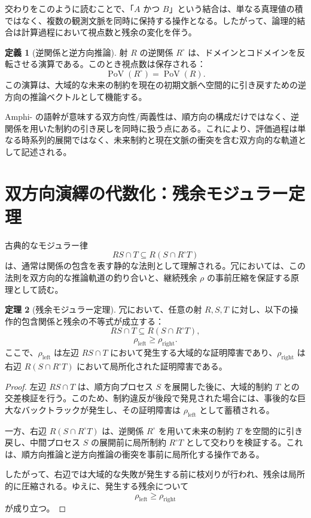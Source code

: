 \documentclass[a4paper,11pt]{article}
\newcommand{\PoV}{\operatorname{PoV}}
\theoremstyle{definition}
\newtheorem{definition}{定義}[section]
\newtheorem{theorem}[definition]{定理}
\begin{document}
交わりをこのように読むことで、「$A$ かつ $B$」という結合は、単なる真理値の積ではなく、複数の観測文脈を同時に保持する操作となる。したがって、論理的結合は計算過程において視点数と残余の変化を伴う。

\begin{definition}[逆関係と逆方向推論]
射 $R$ の逆関係 $R^\circ$ は、ドメインとコドメインを反転させる演算である。このとき視点数は保存される：
\[
\PoV(R^\circ) = \PoV(R).
\]
この演算は、大域的な未来の制約を現在の初期文脈へ空間的に引き戻すための逆方向の推論ベクトルとして機能する。
\end{definition}

Amphi- の語幹が意味する双方向性/両義性は、順方向の構成だけではなく、逆関係を用いた制約の引き戻しを同時に扱う点にある。これにより、評価過程は単なる時系列的展開ではなく、未来制約と現在文脈の衝突を含む双方向的な軌道として記述される。

\section{双方向演繹の代数化：残余モジュラー定理}
古典的なモジュラー律
\[
RS \cap T \subseteq R(S \cap R^\circ T)
\]
は、通常は関係の包含を表す静的な法則として理解される。冗においては、この法則を双方向的な推論軌道の釣り合いと、継続残余 $\rho$ の事前圧縮を保証する原理として読む。

\begin{theorem}[残余モジュラー定理]
冗において、任意の射 $R,S,T$ に対し、以下の操作的包含関係と残余の不等式が成立する：
\[
RS \cap T \subseteq R(S \cap R^\circ T),
\]
\[
\rho_{\mathrm{left}} \ge \rho_{\mathrm{right}}.
\]
ここで、$\rho_{\mathrm{left}}$ は左辺 $RS \cap T$ において発生する大域的な証明障害であり、$\rho_{\mathrm{right}}$ は右辺 $R(S \cap R^\circ T)$ において局所化された証明障害である。
\end{theorem}

\begin{proof}
左辺 $RS \cap T$ は、順方向プロセス $S$ を展開した後に、大域的制約 $T$ との交差検証を行う。このため、制約違反が後段で発見された場合には、事後的な巨大なバックトラックが発生し、その証明障害は $\rho_{\mathrm{left}}$ として蓄積される。

一方、右辺 $R(S \cap R^\circ T)$ は、逆関係 $R^\circ$ を用いて未来の制約 $T$ を空間的に引き戻し、中間プロセス $S$ の展開前に局所制約 $R^\circ T$ として交わりを検証する。これは、順方向推論と逆方向推論の衝突を事前に局所化する操作である。

したがって、右辺では大域的な失敗が発生する前に枝刈りが行われ、残余は局所的に圧縮される。ゆえに、発生する残余について
\[
\rho_{\mathrm{left}} \ge \rho_{\mathrm{right}}
\]
が成り立つ。
\end{proof}
\end{document}
